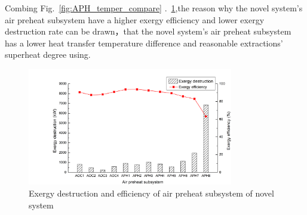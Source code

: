 \documentclass[preprint,12pt]{elsarticle}
\begin{document}
Combing Fig.~\ref{fig:APH_temper_compare}  .~\ref{fig:novel_APH_exergy},the reason why the novel system's air preheat subsystem have a higher exergy efficiency and lower exergy destruction rate can be drawn，that the novel system's air preheat subsystem has a lower heat transfer temperature difference and reasonable extractions' superheat degree using.


\begin{figure}[htbp]
\centering
\includegraphics[width=0.8\textwidth]{fig/novel_APH_exergy.png}
\caption{Exergy destruction and efficiency of air preheat subsystem of novel system} %
\label{fig:novel_APH_exergy}
\end{figure}
\end{document}

